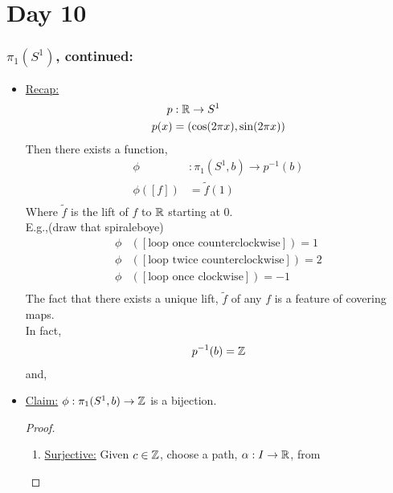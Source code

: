\documentclass[../notes.tex]{subfiles}
\begin{document}
\section{Day 10}
    \subsubsection{$\pi_1(S^1)$, continued:}
    \begin{itemize}
        \item \underline{Recap:}
            \begin{align*}
                p&: \mathbb{R} \rightarrow S^{1}\\
                p(x)&=(\cos(2\pi x), \sin(2\pi x))\\
            \end{align*}
            Then there exists a function,
            \begin{align*}
                \phi &: \pi_1(S^{1}, b)\rightarrow p^{-1}(b)\\
                \phi([f])&=\tilde{f}(1)\\
            \end{align*}
            Where $\tilde{f}$ is the lift of $f$ to $\mathbb{R}$ starting at $0$.\\
            E.g.,(draw that spiraleboye)
            \begin{align*}
                \phi&([\text{loop once counterclockwise}])=1\\
                \phi&([\text{loop twice counterclockwise}])=2\\
                \phi&([\text{loop once clockwise}])=-1\\
            \end{align*}
            The fact that there exists a unique lift, $\tilde{f}$ of any $f$ is a feature
            of covering maps.\\
            In fact,
            \begin{align*}
                p^{-1}(b)=\mathbb{Z}\\
            \end{align*}
            and,\\
        \item \underline{Claim:} $\phi: \pi_1(S^1, b)\rightarrow \mathbb{Z}$ is a bijection.
            \begin{proof}
                \begin{enumerate}
                    \item \underline{Surjective:} Given $c\in\mathbb{Z}$, choose a path, $\alpha: I \rightarrow \mathbb{R}$, from

\end{enumerate}
\end{proof}
\end{itemize}
\end{document}
